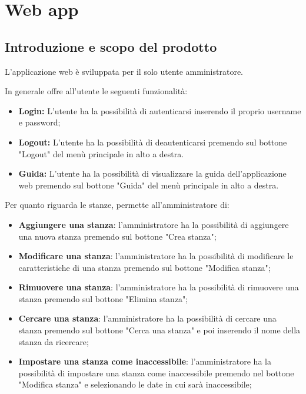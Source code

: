 \section{Web app}

\subsection{Introduzione e scopo del prodotto}
L'applicazione web è sviluppata per il solo utente amministratore.

In generale offre all'utente le seguenti funzionalità:
\begin{itemize}
	\item \textbf{Login:} L'utente ha la possibilità di autenticarsi inserendo il proprio username e password; \\
	\item \textbf{Logout:} L'utente ha la possibilità di deautenticarsi premendo sul bottone "Logout" del menù principale in alto a destra. \\
	\item \textbf{Guida:} L'utente ha la possibilità di visualizzare la guida dell'applicazione web premendo sul bottone "Guida" del menù principale in alto a destra. \\
\end{itemize}
Per quanto riguarda le stanze, permette all'amministratore di:
\begin{itemize}
	\item \textbf{Aggiungere una stanza}: l'amministratore ha la possibilità di aggiungere una nuova stanza premendo sul bottone "Crea stanza"; \\
	\item \textbf{Modificare una stanza}: l'amministratore ha la possibilità di modificare le caratteristiche di una stanza premendo sul bottone "Modifica stanza"; \\
	\item \textbf{Rimuovere una stanza}: l'amministratore ha la possibilità di rimuovere una stanza premendo sul bottone "Elimina stanza"; \\
	\item \textbf{Cercare una stanza}: l'amministratore ha la possibilità di cercare una stanza premendo sul bottone "Cerca una stanza" e poi inserendo il nome della stanza da ricercare; \\
	\item \textbf{Impostare una stanza come inaccessibile}: l'amministratore ha la possibilità di impostare una stanza come inaccessibile premendo nel bottone "Modifica stanza" e selezionando le date in cui sarà inaccessibile; \\
\end{itemize}
